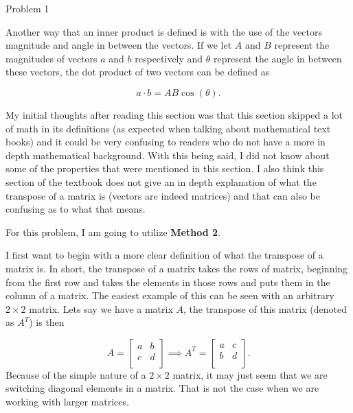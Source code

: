 \begin{problem}{Problem 1}
\begin{highlight}
        Another way that an inner product is defined is with the use of the vectors magnitude and angle in between the vectors. If we let $A$ and $B$ represent the magnitudes of vectors $a$ and $b$ 
        respectively and $\theta$ represent the angle in between these vectors, the dot product of two vectors can be defined as

        \setcounter{equation}{0}
        \begin{equation}
            a \cdot b = AB\cos{(\theta)}.
        \end{equation}

        My initial thoughts after reading this section was that this section skipped a lot of math in its definitions (as expected when talking about mathematical text books) and it could be very 
        confusing to readers who do not have a more in depth mathematical background. With this being said, I did not know about some of the properties that were mentioned in this section. I also 
        think this section of the textbook does not give an in depth explanation of what the transpose of a matrix is (vectors are indeed matrices) and that can also be confusing as to what that means.
    \end{highlight}

    \begin{highlight}
        For this problem, I am going to utilize \textbf{Method 2}. \vspace*{1em}

        I first want to begin with a more clear definition of what the transpose of a matrix is. In short, the transpose of a matrix takes the rows of matrix, beginning from the first row and takes the
        elements in those rows and puts them in the column of a matrix. The easiest example of this can be seen with an arbitrary $2 \times 2$ matrix. Lets say we have a matrix $A$, the transpose of this
        matrix (denoted as $A^{T}$) is then

        \begin{equation}
            A = 
            \begin{bmatrix}
                a & b \\
                c & d \\
            \end{bmatrix}
            \implies
            A^{T} = 
            \begin{bmatrix}
                a & c \\
                b & d \\
            \end{bmatrix}.
        \end{equation}
        Because of the simple nature of a $2 \times 2$ matrix, it may just seem that we are switching diagonal elements in a matrix. That is not the case when we are working with larger matrices.


\end{highlight}
\end{problem}
